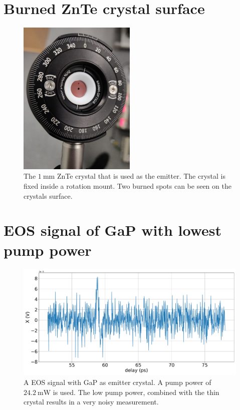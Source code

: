 \section{Burned ZnTe crystal surface}
\begin{figure}
    \centering
    \includegraphics[width=0.5\textwidth]{Plots/burned_crystal.jpeg}
    \caption{The $\SI{1}{\milli\meter}$ ZnTe crystal that is used as the emitter. The crystal is fixed inside a rotation mount.
    Two burned spots can be seen on the crystals surface.}
    \label{fig:ZnTe_burned}
\end{figure}
\newpage
\section{EOS signal of GaP with lowest pump power}
\begin{figure}
    \centering
    \includegraphics[width=\textwidth]{Plots/GaP14_20_20normalX.pdf}
    \caption{A EOS signal with GaP as emitter crystal. A pump power of $\SI{24.2}{\milli\W}$ is used.
    The low pump power, combined with the thin crystal results in a very noisy measurement.}
    \label{fig:GaP_noise}
\end{figure}
